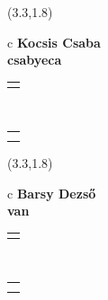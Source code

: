 \documentclass[11pt]{article}
\begin{document}
\makebox(3.3,1.8){
  \renewcommand\arraystretch{1.3}
  \begin{tabular}[c]{c}
    \hspace{8.5mm}
    \LARGE\bf{ Kocsis Csaba }\\
    \hspace{8.5mm}
    \Large{ csabyeca }\\
    \renewcommand\arraystretch{3}
    \begin{tabular}[c]{c}
      \centering
      \fontfamily{phv}\selectfont{
        \textbf{
          \textsc{
            \scriptsize{
            \color{Bright}{ Ismerkedő }\color{Bright}{ Webmester }\color{Bright}{ Sminkmester }\color{Bright}{ Programozó }
            }
          }
        }
      }
    \end{tabular}
    \\
    \renewcommand\arraystretch{1}
    \begin{tabular}{p{3.3in}}
      \hspace{.7cm}\\
      \hspace{.7cm}\emph{  }\\
    \end{tabular}
  \end{tabular}
}

\makebox(3.3,1.8){
  \renewcommand\arraystretch{1.3}
  \begin{tabular}[c]{c}
    \hspace{8.5mm}
    \LARGE\bf{ Barsy Dezső }\\
    \hspace{8.5mm}
    \Large{ van }\\
    \renewcommand\arraystretch{3}
    \begin{tabular}[c]{c}
      \centering
      \fontfamily{phv}\selectfont{
        \textbf{
          \textsc{
            \scriptsize{
            \color{Dark}{ Ismerkedő }\color{Bright}{ Webmester }\color{Bright}{ Sminkmester }\color{Bright}{ Programozó }
            }
          }
        }
      }
    \end{tabular}
    \\
    \renewcommand\arraystretch{1}
    \begin{tabular}{p{3.3in}}
      \hspace{.7cm}\\
      \hspace{.7cm}\emph{  }\\
    \end{tabular}
  \end{tabular}
}
\end{document}
